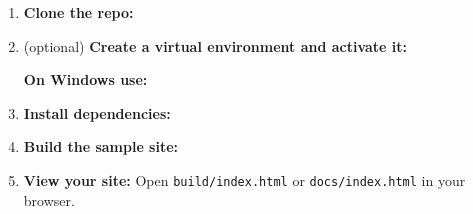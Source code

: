 \begin{enumerate}
\def\labelenumi{\arabic{enumi}.}
\item
  \textbf{Clone the repo:}

\begin{Shaded}
\begin{Highlighting}[]
\end{Highlighting}
\end{Shaded}
\item
  (optional) \textbf{Create a virtual environment and activate it:}

\begin{Shaded}
\begin{Highlighting}[]
 
\end{Highlighting}
\end{Shaded}

  \textbf{On Windows use:}

\begin{Shaded}
\begin{Highlighting}[]
 
\end{Highlighting}
\end{Shaded}
\item
  \textbf{Install dependencies:}

\begin{Shaded}
\begin{Highlighting}[]
\end{Highlighting}
\end{Shaded}
\item
  \textbf{Build the sample site:}

\begin{Shaded}
\begin{Highlighting}[]
\end{Highlighting}
\end{Shaded}
\item
  \textbf{View your site:} Open \texttt{build/index.html} or
  \texttt{docs/index.html} in your browser.
\end{enumerate}

